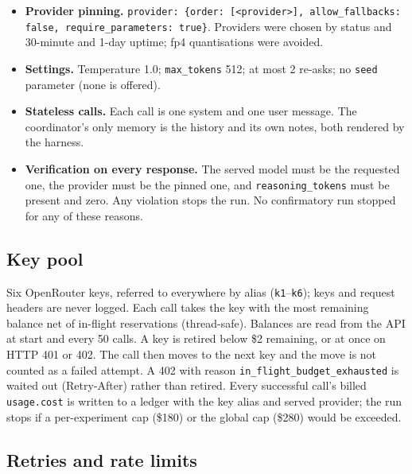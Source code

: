 \documentclass[11pt,letterpaper]{article}
\numberwithin{equation}{section}
\numberwithin{table}{section}
\numberwithin{figure}{section}
\numberwithin{algorithm}{section}
\begin{document}
\begin{itemize}
  \item \textbf{Provider pinning.} \texttt{provider: \{order: [<provider>], allow\_fallbacks: false, require\_parameters: true\}}. Providers were chosen by status and 30-minute and 1-day uptime; fp4 quantisations were avoided.
  \item \textbf{Settings.} Temperature 1.0; \texttt{max\_tokens} 512; at most 2 re-asks; no \texttt{seed} parameter (none is offered).
  \item \textbf{Stateless calls.} Each call is one system and one user message. The coordinator's only memory is the history and its own notes, both rendered by the harness.
  \item \textbf{Verification on every response.} The served model must be the requested one, the provider must be the pinned one, and \texttt{reasoning\_tokens} must be present and zero. Any violation stops the run. No confirmatory run stopped for any of these reasons.
\end{itemize}

\subsection{Key pool}

Six OpenRouter keys, referred to everywhere by alias (\texttt{k1}--\texttt{k6}); keys and request headers are never logged. Each call takes the key with the most remaining balance net of in-flight reservations (thread-safe). Balances are read from the API at start and every 50 calls. A key is retired below \$2 remaining, or at once on HTTP 401 or 402. The call then moves to the next key and the move is not counted as a failed attempt. A 402 with reason \texttt{in\_flight\_budget\_exhausted} is waited out (Retry-After) rather than retired. Every successful call's billed \texttt{usage.cost} is written to a ledger with the key alias and served provider; the run stops if a per-experiment cap (\$180) or the global cap (\$280) would be exceeded.

\subsection{Retries and rate limits}
\end{document}
